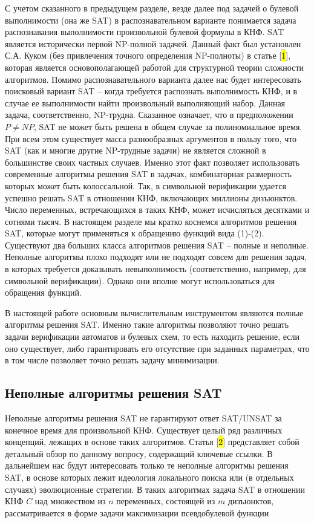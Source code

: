С учетом сказанного в предыдущем разделе, везде далее под задачей о булевой выполнимости (она же SAT) в распознавательном варианте понимается задача распознавания выполнимости произвольной булевой формулы в КНФ. SAT является исторически первой NP-полной задачей. Данный факт был установлен С.А. Куком (без привлечения точного определения NP-полноты) в статье {[}\hl{1}{]}, которая является основополагающей работой для структурной теории сложности алгоритмов. Помимо распознавательного варианта далее нас будет интересовать поисковый вариант SAT -- когда требуется распознать выполнимость КНФ, и в случае ее выполнимости найти произвольный выполняющий набор. Данная задача, соответственно, NP-трудна. Сказанное означает, что в предположении $P \neq NP$, SAT не может быть решена в общем случае за полиномиальное время. При всем этом существует масса разнообразных аргументов в пользу того, что SAT (как и многие другие NP-трудные задачи) не является сложной в большинстве своих частных случаев. Именно этот факт позволяет использовать современные алгоритмы решения SAT в задачах, комбинаторная размерность которых может быть колоссальной. Так, в символьной верификации удается успешно решать SAT в отношении КНФ, включающих миллионы дизъюнктов. Число переменных, встречающихся в таких КНФ, может исчисляться десятками и сотнями тысяч. В настоящем разделе мы кратко коснемся алгоритмов решения SAT, которые могут применяться к обращению функций вида (1)-(2). Существуют два больших класса алгоритмов решения SAT -- полные и неполные. Неполные алгоритмы плохо подходят или не подходят совсем для решения задач, в которых требуется доказывать невыполнимость (соответственно, например, для символьной верификации). Однако они вполне могут использоваться для обращения функций.

В настоящей работе основным вычислительным инструментом являются полные алгоритмы решения SAT. Именно такие алгоритмы позволяют точно решать задачи верификации автоматов и булевых схем, то есть находить решение, если оно существует, либо гарантировать его отсутствие при заданных параметрах, что в том числе позволяет точно решать задачу минимизации.


\subsection{Неполные алгоритмы решения SAT}

Неполные алгоритмы решения SAT не гарантируют ответ SAT/UNSAT за конечное время для произвольной КНФ. Существует целый ряд различных концепций, лежащих в основе таких алгоритмов. Статья {[}\hl{2}{]} представляет собой детальный обзор по данному вопросу, содержащий ключевые ссылки. В дальнейшем нас будут интересовать только те неполные алгоритмы решения SAT, в основе которых лежит идеология локального поиска или (в отдельных случаях) эволюционные стратегии. В таких алгоритмах задача SAT в отношении КНФ $C$ над множеством из $n$ переменных, состоящей из $m$ дизъюнктов, рассматривается в форме задачи максимизации псевдобулевой функции

